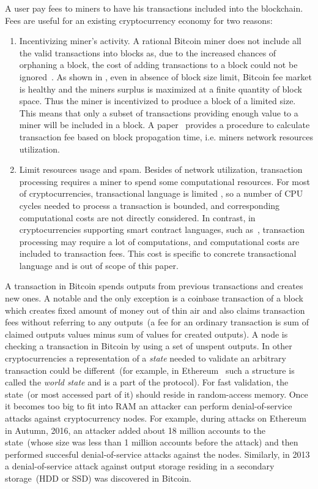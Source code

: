 \documentclass[]{llncs}   %
\begin{document}
A user pay fees to miners to have his transactions included into the blockchain. Fees are useful for an existing cryptocurrency economy for two reasons:

\begin{enumerate}
  \item{Incentivizing miner's activity. } A rational Bitcoin miner does not include all the valid transactions into blocks as, due to the increased chances of orphaning a block, the cost of adding transactions to a block could not be ignored~\cite{andersen2013,rizun2015transaction}. As shown in \cite{rizun2015transaction}, even in absence of block size limit, Bitcoin fee market is healthy and the miners surplus is maximized at a finite quantity of block space. Thus the miner is incentivized to produce a block of a limited size. This means that only a subset of transactions providing enough value to a miner will be included in a block. A paper~\cite{rizun2015transaction} provides a procedure to calculate transaction fee based on block propagation time, i.e. miners network resources utilization.

  \item{Limit resources usage and spam. } Besides of network utilization, transaction processing requires a miner to spend some computational resources. For most of cryptocurrencies, transactional language is limited \cite{script}, so a number of CPU cycles needed to process a transaction is bounded, and corresponding computational costs are not directly considered. In contrast, in cryptocurrencies supporting  smart contract languages, such as~\cite{seijas2016scripting,tezosScript,solidity}, transaction processing may require a lot of computations, and computational costs are included to transaction fees. This cost is specific to concrete transactional language and is out of scope of this paper.
\end{enumerate}

A transaction in Bitcoin spends outputs from previous transactions and creates new ones. A notable and the only exception is a coinbase transaction of a block which creates fixed amount of money out of thin air and also claims transaction fees without referring to any outputs~(a fee for an ordinary transaction is sum of claimed outputs values minus sum of values for created outputs). A node is checking a transaction in Bitcoin by using a set of unspent outputs. In other cryptocurrencies a representation of a \textit{state} needed to validate an arbitrary transaction could be different~(for example, in Ethereum~\cite{ethyp} such a structure is called the \textit{world state} and is a part of the protocol).  For fast validation, the state~(or most accessed part of it) should reside in random-access memory. Once it becomes too big to fit into RAM an attacker can perform denial-of-service attacks against cryptocurrency nodes. For example, during attacks on Ethereum in Autumn, 2016, an attacker added about 18 million accounts to the state~(whose size was less than 1 million accounts before the attack) and then performed succesful denial-of-service attacks against the nodes. Similarly, in 2013 a denial-of-service attack against output storage residing in a secondary storage~(HDD or SSD) was discovered in Bitcoin. 
\end{document}
